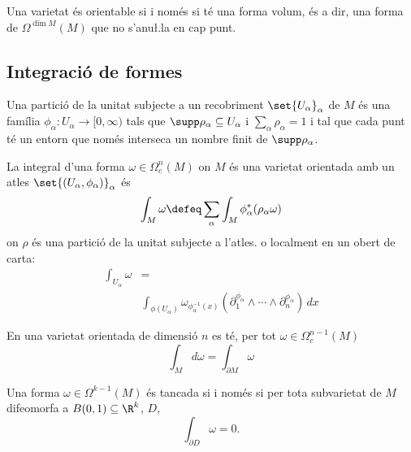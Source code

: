 \documentclass[12pt,twocolumn]{article}
\begin{document}
\begin{proposition}
	Una varietat és orientable si i només si té una forma volum, és a dir, una forma de \(
	\Omega^{\dim M}(M) \) que no s'anu\l.la en cap punt. 
\end{proposition}

\subsection{Integració de formes}
\begin{definition}
	Una partició de la unitat subjecte a un recobriment \( \set{U_\alpha}_\alpha \) de \( M
	\) és una família \( \phi_\alpha \colon U_\alpha \to [0,\infty) \) tals que \( \supp
	\rho_\alpha \subseteq U_\alpha \) i \( \sum_\alpha \rho_\alpha = 1 \) i tal que cada
	punt té un entorn que només interseca un nombre finit de \( \supp \rho_\alpha \). 
\end{definition}

\begin{definition}
	La integral d'una forma \( \omega \in \Omega^n_c(M) \) on \( M \) és una varietat
	orientada amb un atles \( \set{(U_\alpha, \phi_\alpha)}_\alpha \) és
	\begin{equation*}
		\int_M \omega \defeq \sum_{\alpha}  \int_M \phi_\alpha^\ast(\rho_\alpha \omega)
	\end{equation*}
	on \( \rho \) és una partició de la unitat subjecte a l'atles. 
	o localment en un obert de carta:
	\begin{align*}
		\int_{U_\alpha} \omega & =  \\
													 & \int_{\phi(U_\alpha)}
													 \omega_{\phi_\alpha^{-1}(x)}(\partial_1^{\phi_\alpha} \wedge
													 \cdots \wedge \partial_n^{\phi_\alpha}) \, dx
	\end{align*}
\end{definition}

\begin{theorem}
	En una varietat orientada de dimensió \( n \) es té, per tot \( \omega \in
	\Omega^{n-1}_c(M) \)
	\begin{equation*}
		\int_M d\omega = \int_{\partial M} \omega
	\end{equation*}
\end{theorem}

\begin{theorem}
	Una forma \( \omega \in \Omega^{k-1}(M) \) és tancada si i només si per tota subvarietat de
	\( M \) difeomorfa a \( B(0,1) \subseteq \R^k \), \( D \),
	\begin{equation*}
		\int_{\partial D} \omega = 0. 
	\end{equation*}
\end{theorem}
\end{document}

